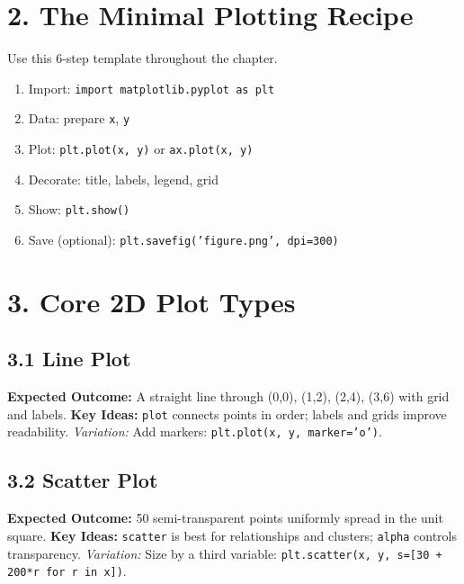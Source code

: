 \section{2. The Minimal Plotting Recipe}
Use this 6-step template throughout the chapter.
\begin{enumerate}
    \item Import: \texttt{import matplotlib.pyplot as plt}
    \item Data: prepare \texttt{x}, \texttt{y}
    \item Plot: \texttt{plt.plot(x, y)} or \texttt{ax.plot(x, y)}
    \item Decorate: title, labels, legend, grid
    \item Show: \texttt{plt.show()}
    \item Save (optional): \texttt{plt.savefig('figure.png', dpi=300)}
\end{enumerate}

\section{3. Core 2D Plot Types}
\subsection{3.1 Line Plot}
\textbf{Expected Outcome:} A straight line through (0,0), (1,2), (2,4), (3,6) with grid and labels.
\textbf{Key Ideas:} \texttt{plot} connects points in order; labels and grids improve readability.
\textit{Variation:} Add markers: \texttt{plt.plot(x, y, marker='o')}.

\subsection{3.2 Scatter Plot}
\textbf{Expected Outcome:} 50 semi-transparent points uniformly spread in the unit square.
\textbf{Key Ideas:} \texttt{scatter} is best for relationships and clusters; \texttt{alpha} controls transparency.
\textit{Variation:} Size by a third variable: \texttt{plt.scatter(x, y, s=[30 + 200*r for r in x])}.

